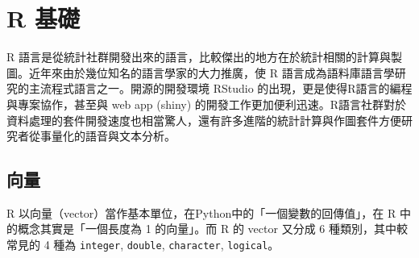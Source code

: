 \appendix

\hypertarget{r-ux57faux790e}{%
\chapter{R 基礎}\label{r-ux57faux790e}}

R
語言是從統計社群開發出來的語言，比較傑出的地方在於統計相關的計算與製圖。近年來由於幾位知名的語言學家的大力推廣，使
R 語言成為語料庫語言學研究的主流程式語言之一。開源的開發環境 RStudio
的出現，更是使得R語言的編程與專案協作，甚至與 web app (shiny)
的開發工作更加便利迅速。R語言社群對於資料處理的套件開發速度也相當驚人，還有許多進階的統計計算與作圖套件方便研究者從事量化的語音與文本分析。

\hypertarget{ux5411ux91cf}{%
\section{向量}\label{ux5411ux91cf}}

R 以向量（vector）當作基本單位，在Python中的「一個變數的回傳值」，在 R
中的概念其實是「一個長度為 1 的向量」。而 R 的 vector 又分成 6
種類別，其中較常見的 4 種為 \texttt{integer}, \texttt{double},
\texttt{character}, \texttt{logical}。

